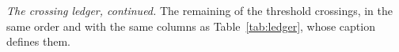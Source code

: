 \begin{table}
\centering
\caption{\emph{The crossing ledger, continued.} The remaining
\CxLedgerPartTwo{} of the \EvNCrossRaw{} threshold crossings, in the same
order and with the same columns as Table~\ref{tab:ledger}, whose caption
defines them.}
\label{tab:ledgercont}
\tiny

\end{table}
